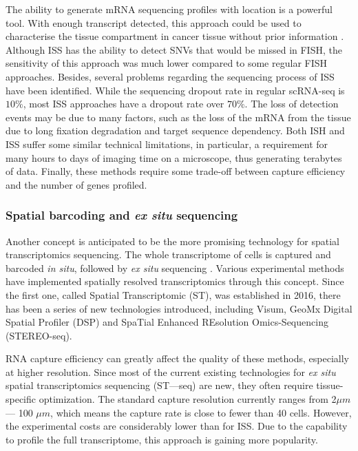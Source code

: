 The ability to generate mRNA sequencing profiles with location is a powerful tool. With enough transcript detected, this approach could be used to characterise the tissue compartment in cancer tissue without prior information  \cite{ke2013situ}. Although ISS has the ability to detect SNVs that would be missed in FISH, the sensitivity of this approach was much lower compared to some regular FISH approaches. Besides, several problems regarding the sequencing process of ISS have been identified. While the sequencing dropout rate in regular scRNA-seq is $10\%$, most ISS approaches have a dropout rate over $70\%$. The loss of detection events may be due to many factors, such as the loss of the
mRNA from the tissue due to long fixation degradation and target sequence dependency. Both ISH and ISS suffer some similar technical limitations, in particular, a requirement for many hours to days of imaging time on a microscope, thus generating terabytes of data. Finally, these methods require some trade-off between capture efficiency and the number of genes profiled. 

\subsubsection{Spatial barcoding and \textit{ex situ} sequencing}
Another concept is anticipated to be the more promising technology for spatial transcriptomics sequencing. The whole transcriptome of cells is captured and barcoded \textit{in situ}, followed by \textit{ex situ} sequencing \cite{asp2020spatially}. Various experimental methods have implemented spatially resolved transcriptomics through this concept. Since the first one, called Spatial Transcriptomic (ST), was established in 2016, there has been a series of new technologies introduced, including Visum, GeoMx Digital Spatial Profiler (DSP) and SpaTial Enhanced REsolution Omics-Sequencing (STEREO-seq). 

RNA capture efficiency can greatly affect the quality of these methods, especially at higher resolution. Since most of the current existing technologies for \textit{ex situ} spatial transcriptomics sequencing (ST—seq) are new, they often require tissue-specific optimization. The standard capture resolution currently ranges from 2$\mu m$ — 100 $\mu m$, which means the capture rate is close to fewer than 40 cells. However, the experimental costs are considerably lower than for ISS. Due to the capability to profile the full transcriptome, this approach is gaining more popularity.          

